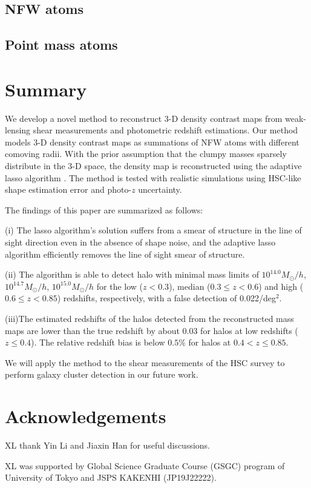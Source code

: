 \documentclass[twocolumn]{aastex63}
\begin{document}
\subsection{NFW atoms}
\label{subsec_test-nfw}


\subsection{Point mass atoms}
\label{subsec_test-pm}




\section{Summary}
\label{sec_Sum}

We develop a novel method to reconstruct $3$-D density contrast maps from
weak-lensing shear measurements and photometric redshift estimations.  Our
method models $3$-D density contrast maps as summations of NFW atoms with
different comoving radii.  With the prior assumption that the clumpy masses
sparsely distribute in the $3$-D space, the density map is reconstructed
using the adaptive lasso algorithm \citep{AdaLASSO-Zou2006}. The method is
tested with realistic simulations using HSC-like shape estimation error and
photo-$z$ uncertainty.

The findings of this paper are summarized as follows:

(i) The lasso algorithm's solution suffers from a smear of structure in the
line of sight direction even in the absence of shape noise, and the adaptive
lasso algorithm efficiently removes the line of sight smear of structure.

(ii) The algorithm is able to detect halo with minimal mass limits of
$10^{14.0} M_{\odot}/h$, $10^{14.7} M_{\odot}/h$, $10^{15.0} M_{\odot}/h$ for
the low ($z<0.3$), median ($0.3\leq z< 0.6$) and high ($0.6\leq z< 0.85$)
redshifts, respectively, with a false detection of 0.022/deg$^2$.

(iii)The estimated redshifts of the halos detected from the reconstructed mass
maps are lower than the true redshift by about $0.03$ for halos at low
redshifts ($z\leq 0.4$).  The relative redshift bias is below $0.5\%$ for halos
at $0.4<z\leq 0.85$.

We will apply the method to the shear measurements of the HSC survey
\citep{HSC1-catalog,FPFSHSC1-Li2020} to perform galaxy cluster detection in our
future work.

\section*{Acknowledgements}
XL thank Yin Li and Jiaxin Han for useful discussions.

XL was supported by Global Science Graduate Course (GSGC) program of
University of Tokyo and JSPS KAKENHI (JP19J22222).


\end{document}
